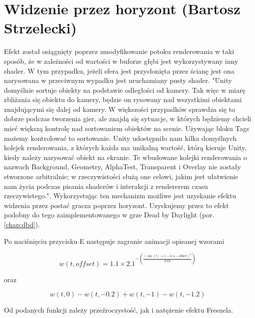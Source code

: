 \section{Widzenie przez horyzont (Bartosz Strzelecki)}\label{s:wid_impl}
Efekt został osiągnięty poprzez zmodyfikowanie potoku renderowania w taki sposób, że w zależności od wartości w buforze głębi jest wykorzystywany inny shader.
W tym przypadku, jeżeli sfera jest przysłonięta przez ścianę jest ona narysowana w przeciwnym wypadku jest uruchamiany pusty shader.
"Unity domyślnie sortuje obiekty na podstawie odległości od kamery. Tak więc
w miarę zbliżania się obiektu do kamery, będzie on rysowany nad wszystkimi obiektami znajdującymi się dalej od kamery.
W większości przypadków sprawdza się to dobrze podczas tworzenia gier, ale
znajdą się sytuacje, w których będziemy chcieli mieć większą kontrolę nad sortowaniem obiektów na scenie. Używając bloku Tags{} możemy kontrolować to sortowanie.
Unity udostępniło nam kilka domyślnych kolejek renderowania, z których każda ma unikalną wartość, którą
kieruje Unity, kiedy należy narysować obiekt na ekranie. Te wbudowane kolejki renderowania
o nazwach Background, Geometry, AlphaTest, Transparent i Overlay nie zostały stworzone arbitralnie; w rzeczywistości służą one celowi, jakim jest ułatwienie nam życia podczas
pisania shaderów i interakcji z rendererem czasu rzeczywistego."\cite{shaderscookbook}. Wykorzystując ten mechanizm
możliwe jest uzyskanie efektu widzenia przez postać gracza poprzez horyzont. Uzyskujemy przez to efekt podobny do tego zaimplementowanego w grze Dead by Daylight (por. \ref{chap:dbd}).

Po naciśnięciu przycisku E następuje zagranie animacji opisanej wzorami 

\begin{equation}
w(t, offset) = 1.1 \times 2.1^{-\left(\frac{{\left(\sin(t) + 1 - 0.4 - \text{{offset}}\right)^2}}{{0.02}}\right)}
\end{equation}

oraz

\begin{equation}
w(t, 0) - w(t, -0.2) + w(t, -1) - w(t, -1.2)
\end{equation}

Od podanych funkcji zależy przeźroczystość, jak i natężenie efektu Fresnela. 

